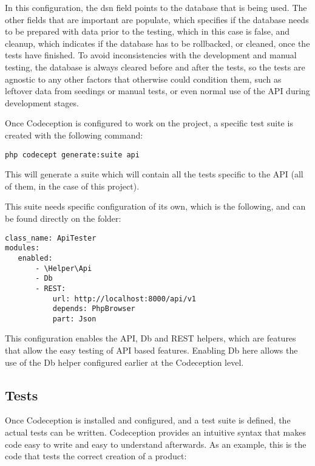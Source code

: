 In this configuration, the dsn field points to the database that is being used. The other fields that are important are populate, which specifies if the database needs to be prepared with data prior to the testing, which in this case is false, and cleanup, which indicates if the database has to be rollbacked, or cleaned, once the tests have finished. To avoid inconsistencies with the development and manual testing, the database is always cleared before and after the tests, so the tests are agnostic to any other factors that otherwise could condition them, such as leftover data from seedings or manual tests, or even normal use of the API during development stages.

Once Codeception is configured to work on the project, a specific test suite is created with the following command:

\begin{verbatim}
php codecept generate:suite api
\end{verbatim}

This will generate a suite which will contain all the tests specific to the API (all of them, in the case of this project).

This suite needs specific configuration of its own, which is the following, and can be found directly on the  folder:

\begin{verbatim}
class_name: ApiTester
modules:
   enabled:
       - \Helper\Api
       - Db
       - REST:
           url: http://localhost:8000/api/v1
           depends: PhpBrowser
           part: Json
\end{verbatim}

This configuration enables the API, Db and REST helpers, which are features that allow the easy testing of API based features. Enabling Db here allows the use of the Db helper configured earlier at the Codeception level.

\subsection{Tests}
Once Codeception is installed and configured, and a test suite is defined, the actual tests can be written. Codeception provides an intuitive syntax that makes code easy to write and easy to understand afterwards. As an example, this is the code that tests the correct creation of a product:

